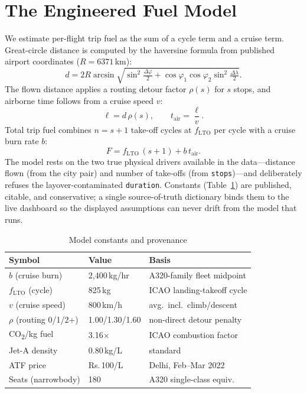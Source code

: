 \documentclass[conference]{IEEEtran}
\newcommand{\INR}{\mbox{Rs.}}
\newcommand{\co}{\mbox{CO\textsubscript{2}}}
\begin{document}
\section{The Engineered Fuel Model}\label{sec:fuel}
We estimate per-flight trip fuel as the sum of a cycle term and a cruise term. Great-circle distance is computed by the haversine formula from published airport coordinates ($R=6371$\,km):
\begin{equation}
d = 2R\arcsin\!\sqrt{\sin^2\!\tfrac{\Delta\varphi}{2} + \cos\varphi_1\cos\varphi_2\sin^2\!\tfrac{\Delta\lambda}{2}}.
\label{eq:haversine}
\end{equation}
The flown distance applies a routing detour factor $\rho(s)$ for $s$ stops, and airborne time follows from a cruise speed $v$:
\begin{equation}
\ell = d\,\rho(s), \qquad
t_{\mathrm{air}} = \frac{\ell}{v}.
\label{eq:airborne}
\end{equation}
Total trip fuel combines $n=s+1$ take-off cycles at $f_{\mathrm{LTO}}$ per cycle with a cruise burn rate $b$:
\begin{equation}
F = f_{\mathrm{LTO}}\,(s+1) + b\,t_{\mathrm{air}}.
\label{eq:fuel}
\end{equation}
The model rests on the two true physical drivers available in the data---distance flown (from the city pair) and number of take-offs (from \texttt{stops})---and deliberately refuses the layover-contaminated \texttt{duration}. Constants (Table~\ref{tab:const}) are published, citable, and conservative; a single source-of-truth dictionary binds them to the live dashboard so the displayed assumptions can never drift from the model that runs.

\begin{table}[!t]
\caption{Model constants and provenance}
\label{tab:const}
\centering
\renewcommand{\arraystretch}{1.15}
\begin{tabular}{@{}llp{3.05cm}@{}}
\toprule
\textbf{Symbol} & \textbf{Value} & \textbf{Basis}\\
\midrule
$b$ (cruise burn) & 2{,}400\,kg/hr & A320-family fleet midpoint\\
$f_{\mathrm{LTO}}$ (cycle) & 825\,kg & ICAO landing-takeoff cycle\\
$v$ (cruise speed) & 800\,km/h & avg.\ incl.\ climb/descent\\
$\rho$ (routing 0/1/2+) & 1.00/1.30/1.60 & non-direct detour penalty\\
\co{}/kg fuel & 3.16$\times$ & ICAO combustion factor\\
Jet-A density & 0.80\,kg/L & standard\\
ATF price & \INR{}\,100/L & Delhi, Feb--Mar 2022\\
Seats (narrowbody) & 180 & A320 single-class equiv.\\
\bottomrule
\end{tabular}
\end{table}
\end{document}

